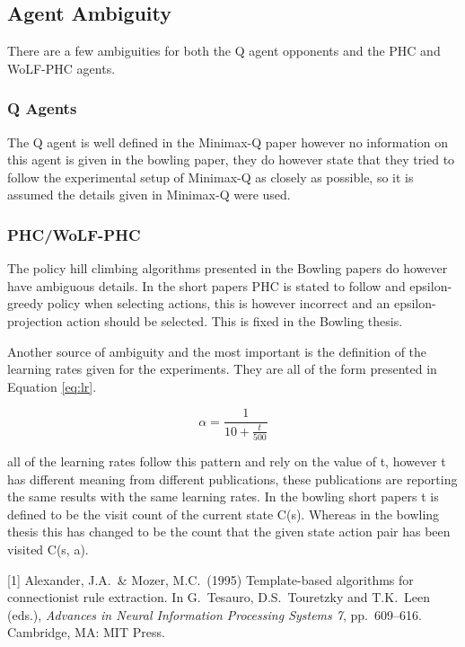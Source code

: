 \documentclass{article}
\begin{document}
\subsection*{Agent Ambiguity}

There are a few ambiguities for both the Q agent opponents and the PHC and WoLF-PHC agents. 

\subsubsection*{Q Agents}

The Q agent is well defined in the Minimax-Q paper however no information on this agent is given in the bowling paper, they do however state that they tried to follow the experimental setup of Minimax-Q as closely as possible, so it is assumed the details given in Minimax-Q were used.

\subsubsection*{PHC/WoLF-PHC}

The policy hill climbing algorithms presented in the Bowling papers do however have ambiguous details. In the short papers PHC is stated to follow and epsilon-greedy policy when selecting actions, this is however incorrect and an epsilon-projection action should be selected. This is fixed in the Bowling thesis.

Another source of ambiguity and the most important is the definition of the learning rates given for the experiments. They are all of the form presented in Equation \ref{eq:lr}. 

\begin{equation}
    \alpha = \frac{1}{10+\frac{t}{500}}\label{eq:lr}
\end{equation}

all of the learning rates follow this pattern and rely on the value of t, however t has different meaning from different publications, these publications are reporting the same results with the same learning rates. In the bowling short papers t is defined to be the visit count of the current state C(s). Whereas in the bowling thesis this has changed to be the count that the given state action pair has been visited C(s, a).



\medskip

\small

[1] Alexander, J.A.\ \& Mozer, M.C.\ (1995) Template-based algorithms for
connectionist rule extraction. In G.\ Tesauro, D.S.\ Touretzky and T.K.\ Leen
(eds.), {\it Advances in Neural Information Processing Systems 7},
pp.\ 609--616. Cambridge, MA: MIT Press.
\end{document}
